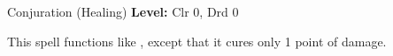 {Conjuration (Healing)}
{
	\textbf{Level:}
	Clr 0, Drd 0\\
}
{
	This spell functions like , except that it cures only 1 point of damage.

}
